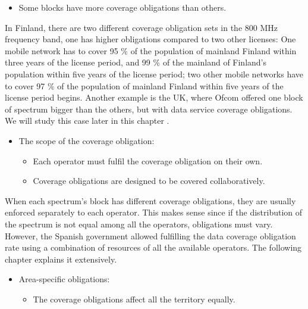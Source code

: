 {\begin{itemize}
\begin{itemize}
	\item Some blocks have more coverage obligations than others.\par
\end{itemize}
\end{itemize}
In Finland, there are two different coverage obligation sets in the 800 MHz frequency band, one has higher obligations compared to two other licenses: One mobile network has to cover 95 $\%$  of the population of mainland Finland within three years of the license period, and 99 $\%$  of the mainland of Finland's population within five years of the license period; two other mobile networks have to cover 97 $\%$  of the population of mainland Finland within five years of the license period begins.  Another example is the UK, where Ofcom offered one block of spectrum bigger than the others, but with data service coverage obligations. We will study this case later in this chapter \cite{2-09}.\par

\begin{itemize}
	\item The scope of the coverage obligation:\par

\begin{itemize}
	\item Each operator must fulfil the coverage obligation on their own.\par

	\item Coverage obligations are designed to be covered collaboratively.\par
\end{itemize}
\end{itemize}
When each spectrum’s block has different coverage obligations, they are usually enforced separately to each operator. This makes sense since if the distribution of the spectrum is not equal among all the operators, obligations must vary. However, the Spanish government allowed fulfilling the data coverage obligation rate using a combination of resources of all the available operators. The following chapter explains it extensively.\par

\begin{itemize}
	\item Area-specific obligations:\par

\begin{itemize}
	\item The coverage obligations affect all the territory equally.\par


\end{itemize}
\end{itemize}}
